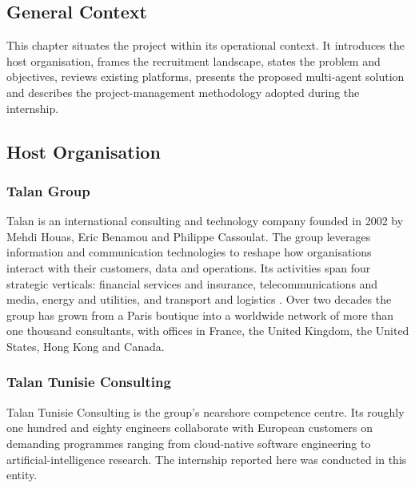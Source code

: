 \begin{center}
    \chapter{General Context}
\end{center}
\label{chap:generalcontext}

\noindent This chapter situates the project within its operational context.
It introduces the host organisation, frames the recruitment landscape,
states the problem and objectives, reviews existing platforms, presents the
proposed multi-agent solution and describes the project-management
methodology adopted during the internship.

\section{Host Organisation}

\subsection{Talan Group}
Talan is an international consulting and technology company founded in 2002
by Mehdi Houas, Eric Benamou and Philippe Cassoulat. The group leverages
information and communication technologies to reshape how organisations
interact with their customers, data and operations. Its activities span
four strategic verticals: financial services and insurance, telecommunications
and media, energy and utilities, and transport and logistics
. Over two decades the group has grown from a Paris
boutique into a worldwide network of more than one thousand consultants,
with offices in France, the United Kingdom, the United States, Hong Kong
and Canada.

\subsection{Talan Tunisie Consulting}
Talan Tunisie Consulting is the group's nearshore competence centre. Its
roughly one hundred and eighty engineers collaborate with European customers
on demanding programmes ranging from cloud-native software engineering to
artificial-intelligence research. The internship reported here was
conducted in this entity.

